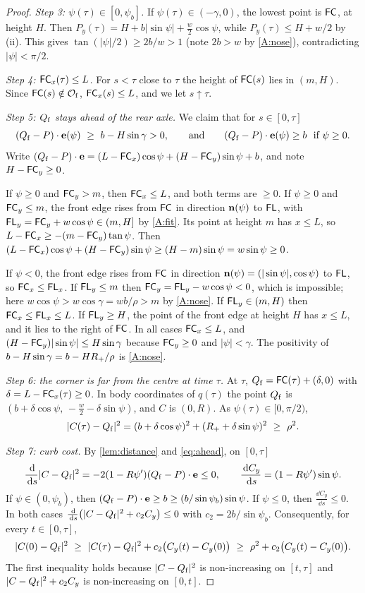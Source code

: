 \begin{proof}
\emph{Step 3: $\psi(\tau)\in[0,\psi_b]$.}
If $\psi(\tau)\in(-\gamma,0)$, the lowest point is $\mathsf{FC}$, at height $H$.
Then $P_y(\tau)=H+b|\sin\psi|+\tfrac w2\cos\psi$, while $P_y(\tau)\le H+w/2$ by (ii).
This gives $\tan(|\psi|/2)\ge 2b/w>1$ (note $2b>w$ by \ref{A:nose}), contradicting $|\psi|<\pi/2$.

\emph{Step 4: $\mathsf{FC}_x(\tau)\le L$.}
For $s<\tau$ close to $\tau$ the height of $\mathsf{FC}(s)$ lies in $(m,H)$.
Since $\mathsf{FC}(s)\notin\mathcal{O}_{\mathrm f}$, $\mathsf{FC}_x(s)\le L$, and we let $s\uparrow\tau$.

\emph{Step 5: $Q_{\mathrm f}$ stays ahead of the rear axle.}
We claim that for $s\in[0,\tau]$
\begin{equation}\label{eq:ahead}
  (Q_{\mathrm f}-P)\cdot\mathbf{e}(\psi)\ \ge\ b-H\sin\gamma>0,\qquad\text{and}\qquad (Q_{\mathrm f}-P)\cdot\mathbf{e}(\psi)\ge b\ \text{ if }\psi\ge0 .
\end{equation}
Write $(Q_{\mathrm f}-P)\cdot\mathbf{e}=(L-\mathsf{FC}_x)\cos\psi+(H-\mathsf{FC}_y)\sin\psi+b$, and note $H-\mathsf{FC}_y\ge0$.

If $\psi\ge0$ and $\mathsf{FC}_y>m$, then $\mathsf{FC}_x\le L$, and both terms are $\ge0$.
If $\psi\ge0$ and $\mathsf{FC}_y\le m$, the front edge rises from $\mathsf{FC}$ in direction $\mathbf{n}(\psi)$ to $\mathsf{FL}$, with $\mathsf{FL}_y=\mathsf{FC}_y+w\cos\psi\in(m,H]$ by \ref{A:fit}.
Its point at height $m$ has $x\le L$, so $L-\mathsf{FC}_x\ge-(m-\mathsf{FC}_y)\tan\psi$.
Then $(L-\mathsf{FC}_x)\cos\psi+(H-\mathsf{FC}_y)\sin\psi\ge(H-m)\sin\psi=w\sin\psi\ge0$.

If $\psi<0$, the front edge rises from $\mathsf{FC}$ in direction $\mathbf{n}(\psi)=(|\sin\psi|,\cos\psi)$ to $\mathsf{FL}$, so $\mathsf{FC}_x\le\mathsf{FL}_x$.
If $\mathsf{FL}_y\le m$ then $\mathsf{FC}_y=\mathsf{FL}_y-w\cos\psi<0$, which is impossible; here $w\cos\psi>w\cos\gamma=wb/\rho>m$ by \ref{A:nose}.
If $\mathsf{FL}_y\in(m,H)$ then $\mathsf{FC}_x\le\mathsf{FL}_x\le L$.
If $\mathsf{FL}_y\ge H$, the point of the front edge at height $H$ has $x\le L$, and it lies to the right of $\mathsf{FC}$.
In all cases $\mathsf{FC}_x\le L$, and $(H-\mathsf{FC}_y)|\sin\psi|\le H\sin\gamma$ because $\mathsf{FC}_y\ge0$ and $|\psi|<\gamma$.
The positivity of $b-H\sin\gamma=b-HR_{+}/\rho$ is \ref{A:nose}.

\emph{Step 6: the corner is far from the centre at time $\tau$.}
At $\tau$, $Q_{\mathrm f}=\mathsf{FC}(\tau)+(\delta,0)$ with $\delta=L-\mathsf{FC}_x(\tau)\ge0$.
In body coordinates of $q(\tau)$ the point $Q_{\mathrm f}$ is $(b+\delta\cos\psi,\,-\tfrac w2-\delta\sin\psi)$, and $C$ is $(0,R)$.
As $\psi(\tau)\in[0,\pi/2)$,
\[
  |C(\tau)-\Qf|^2=(b+\delta\cos\psi)^2+(\Rp+\delta\sin\psi)^2\ \ge\ \rho^2 .
\]

\emph{Step 7: curb cost.}
By \cref{lem:distance} and \eqref{eq:ahead}, on $[0,\tau]$
\[
  \frac{\,\mathrm{d}}{\,\mathrm{d} s}|C-Q_{\mathrm f}|^2=-2(1-R\psi')(Q_{\mathrm f}-P)\cdot\mathbf{e}\le0,\qquad \frac{\,\mathrm{d} C_y}{\,\mathrm{d} s}=(1-R\psi')\sin\psi .
\]
If $\psi\in(0,\psi_b)$, then $(Q_{\mathrm f}-P)\cdot\mathbf{e}\ge b\ge(b/\sin\psi_b)\sin\psi$.
If $\psi\le0$, then $\frac{\dd C_y}{\dd s}\le0$.
In both cases $\frac{\,\mathrm{d}}{\,\mathrm{d} s}\big(|C-Q_{\mathrm f}|^2+c_2C_y\big)\le0$ with $c_2=2b/\sin\psi_b$.
Consequently, for every $t\in[0,\tau]$,
\begin{equation}\label{eq:curbcost}
  |C(0)-\Qf|^2\ \ge\ |C(\tau)-\Qf|^2+c_2\big(C_y(t)-C_y(0)\big)\ \ge\ \rho^2+c_2\big(C_y(t)-C_y(0)\big).
\end{equation}
The first inequality holds because $|C-Q_{\mathrm f}|^2$ is non-increasing on $[t,\tau]$ and $|C-Q_{\mathrm f}|^2+c_2C_y$ is non-increasing on $[0,t]$.


\end{proof}
